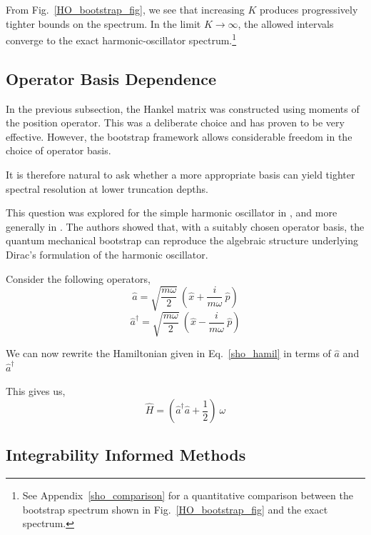 \documentclass{article}
\theoremstyle{definition}
\begin{document}
From Fig.~\ref{HO_bootstrap_fig}, we see that increasing $K$ produces progressively tighter bounds on the spectrum. In the limit $K\to\infty$, the allowed intervals converge to the exact harmonic-oscillator spectrum.\footnote{See Appendix~\ref{sho_comparison} for a quantitative comparison between the bootstrap spectrum shown in Fig.~\ref{HO_bootstrap_fig} and the exact spectrum.}

\subsection{Operator Basis Dependence}

In the previous subsection, the Hankel matrix was constructed using moments of the position operator. This was a deliberate choice and has proven to be very effective. However, the bootstrap framework allows considerable freedom in the choice of operator basis.

It is therefore natural to ask whether a more appropriate basis can yield tighter spectral resolution at lower truncation depths.

This question was explored for the simple harmonic oscillator in \cite{Aikawa2022}, and more generally in \cite{Aikawa2025}. The authors showed that, with a suitably chosen operator basis, the quantum mechanical bootstrap can reproduce the algebraic structure underlying Dirac's formulation of the harmonic oscillator.

Consider the following operators, 
\begin{equation*}
    \hat{a} = \sqrt{\frac{m\omega}{2}} \ (\hat{x} + \frac{i}{m\omega} \ \hat{p} )
\end{equation*}
\begin{equation*}
    \hat{a}^{\dagger} = \sqrt{\frac{m\omega}{2}} \ (\hat{x} - \frac{i}{m\omega} \ \hat{p} )
\end{equation*}

We can now rewrite the Hamiltonian given in Eq.~\eqref{sho_hamil} in terms of $\hat{a}$ and $\hat{a}^{\dagger}$

This gives us, 
\begin{equation}\label{sho_ladder}
    \hat{H} = (\hat{a}^{\dagger}\hat{a} + \frac{1}{2}) \ \omega
\end{equation}


\subsection{Integrability Informed Methods}
\end{document}
